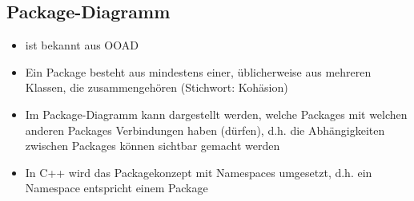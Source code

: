 \subsection{Package-Diagramm}
\begin{itemize}
	\item ist bekannt aus OOAD
	\item Ein Package besteht aus mindestens einer, üblicherweise aus mehreren Klassen, die zusammengehören (Stichwort: Kohäsion)
	\item Im Package-Diagramm kann dargestellt werden, welche Packages mit welchen anderen Packages Verbindungen haben (dürfen), d.h. die Abhängigkeiten zwischen Packages können sichtbar gemacht werden
	\item In C++ wird das Packagekonzept mit Namespaces umgesetzt, d.h. ein Namespace entspricht einem Package
\end{itemize}
